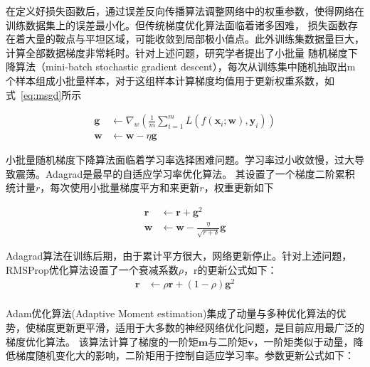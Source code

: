 在定义好损失函数后，通过误差反向传播算法调整网络中的权重参数，使得网络在训练数据集上的误差最小化。但传统梯度优化算法面临着诸多困难，
损失函数存在着大量的鞍点与平坦区域，可能收敛到局部极小值点。此外训练集数据量巨大，计算全部数据梯度非常耗时。针对上述问题，研究学者提出了小批量
随机梯度下降算法（mini-batch stochastic gradient descent），每次从训练集中随机抽取出m个样本组成小批量样本，对于这组样本计算梯度均值用于更新权重系数，如式~\ref{eq:msgd}所示

\begin{equation}
  \begin{aligned}
    \boldsymbol{g}  & \leftarrow \nabla_{w}\left(\frac{1}{m} \sum_{i=1}^{m} L\left(f\left(\boldsymbol{x}_{i} ; \boldsymbol{w}\right), \boldsymbol{y}_{i}\right)\right) \\
    \boldsymbol{w}  & \leftarrow  \boldsymbol{w} - \eta \boldsymbol{g}
  \end{aligned}
  \label{eq:msgd}
\end{equation}

小批量随机梯度下降算法面临着学习率选择困难问题。学习率过小收敛慢，过大导致震荡。Adagrad是最早的自适应学习率优化算法。
其设置了一个梯度二阶累积统计量$r$，每次使用小批量梯度平方和来更新$r$，权重更新如下

\begin{equation}
  \begin{aligned}
    \boldsymbol{r}  & \leftarrow   \boldsymbol{r}  +  \boldsymbol{g}^2\\
    \boldsymbol{w}  & \leftarrow  \boldsymbol{w} - \frac{\eta}{\sqrt{r + \delta}} \boldsymbol{g}
  \end{aligned}
  \label{eq:adagrad}
\end{equation}

Adagrad算法在训练后期，由于累计平方很大，网络更新停止。针对上述问题，RMSProp优化算法设置了一个衰减系数$\rho$，r的更新公式如下：
\begin{equation}
  \begin{aligned}
    \boldsymbol{r}  & \leftarrow  \rho \boldsymbol{r}  + (1-\rho) \boldsymbol{g}^2\\
  \end{aligned}
  \label{eq:Rmsprop}
\end{equation}

Adam优化算法(Adaptive Moment estimation)集成了动量与多种优化算法的优势，使梯度更新更平滑，适用于大多数的神经网络优化问题，是目前应用最广泛的梯度优化算法。
该算法计算了梯度的一阶矩$\boldsymbol{m}$与二阶矩$\boldsymbol{v}$，一阶矩类似于动量，降低梯度随机变化大的影响，二阶矩用于控制自适应学习率。参数更新公式如下：

